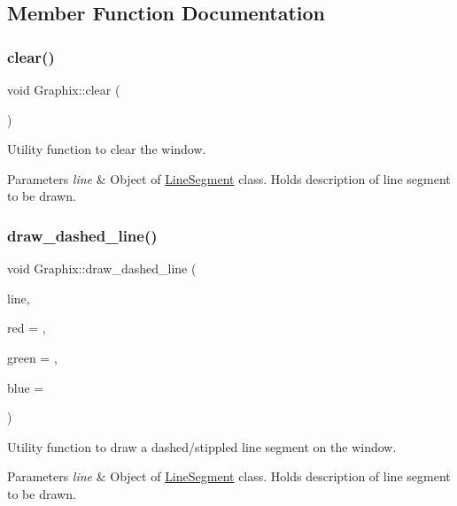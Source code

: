 \subsection{Member Function Documentation}
\mbox{\label{classGraphix_a1ac1a5725a869ef074da6fe3cab29b0e}} 
\subsubsection{\texorpdfstring{clear()}{clear()}}
{\footnotesize\ttfamily void Graphix\+::clear (\begin{DoxyParamCaption}{ }\end{DoxyParamCaption})}

Utility function to clear the window. 
\begin{DoxyParams}{Parameters}
{\em line} & Object of \hyperlink{classLineSegment}{Line\+Segment} class. Holds description of line segment to be drawn. \\
\hline
\end{DoxyParams}
\mbox{\label{classGraphix_a9a1ebf0c6d508ce4686b9794c4dec871}} 
\subsubsection{\texorpdfstring{draw\+\_\+dashed\+\_\+line()}{draw\_dashed\_line()}}
{\footnotesize\ttfamily void Graphix\+::draw\+\_\+dashed\+\_\+line (\begin{DoxyParamCaption}\item[{\hyperlink{classLineSegment}{Line\+Segment}}]{line,  }\item[{G\+Lfloat}]{red = {},  }\item[{G\+Lfloat}]{green = {},  }\item[{G\+Lfloat}]{blue = {} }\end{DoxyParamCaption})}

Utility function to draw a dashed/stippled line segment on the window. 
\begin{DoxyParams}{Parameters}
{\em line} & Object of \hyperlink{classLineSegment}{Line\+Segment} class. Holds description of line segment to be drawn. \\
\hline
\end{DoxyParams}
\mbox{\label{classGraphix_a74af1cd957a0fc3b5e0ee1f951a994e1}} 
